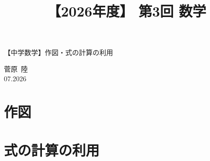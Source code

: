 \documentclass[12pt,a4paper]{jsarticle}
\title{【2026年度】 第3回 数学}                %
\author{}                     %
\date{}                       %
\begin{document}
\begin{center}
{\LARGE 【中学数学】作図・式の計算の利用}
\end{center}

\vspace{5mm}
\begin{flushright}
  菅原\ 陸\\[1.2em]
  07.2026
\end{flushright}


\section{作図}



\section{式の計算の利用}



\bookletpadpages
\end{document}
